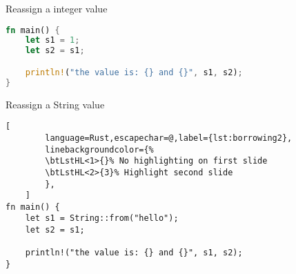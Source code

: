 
\begin{frame}[fragile,t]{Reassign a integer value}
    \begin{lstlisting}[language=Rust,escapechar=@,label={lst:borrowing1}]
fn main() {
    let s1 = 1;
    let s2 = s1;

    println!("the value is: {} and {}", s1, s2);
}\end{lstlisting}
    \pause %
\end{frame}

\begin{frame}[fragile,t]{Reassign a String value}
    \begin{lstlisting}[
        language=Rust,escapechar=@,label={lst:borrowing2},
        linebackgroundcolor={%
        \btLstHL<1>{}% No highlighting on first slide
        \btLstHL<2>{3}% Highlight second slide
        },
    ]
fn main() {
    let s1 = String::from("hello");
    let s2 = s1;

    println!("the value is: {} and {}", s1, s2);
}\end{lstlisting}
    \pause
\end{frame}
